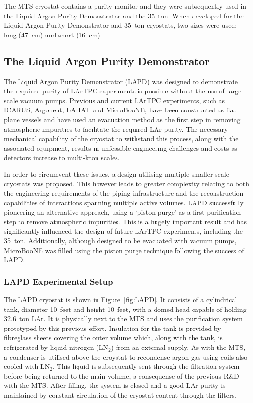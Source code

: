 The MTS cryostat contains a purity monitor and they were subsequently used in the Liquid Argon Purity Demonstrator and the 35~ton.  When developed for the Liquid Argon Purity Demonstrator and 35~ton cryostats, two sizes were used; long (47~cm) and short (16~cm).

\subsection{The Liquid Argon Purity Demonstrator}\label{sec:LAPD}

The Liquid Argon Purity Demonstrator (LAPD) \cite{MTS2011,LAPD2014,LAPDJINST2014} was designed to demonstrate the required purity of LArTPC experiments is possible without the use of large scale vacuum pumps.  Previous and current LArTPC experiments, such as ICARUS, Argoneut, LArIAT and MicroBooNE, have been constructed as flat plane vessels and have used an evacuation method as the first step in removing atmospheric impurities to facilitate the required LAr purity.  The necessary mechanical capability of the cryostat to withstand this process, along with the associated equipment, results in unfeasible engineering challenges and costs as detectors increase to multi-kton scales.

In order to circumvent these issues, a design utilising multiple smaller-scale cryostats was proposed.  This however leads to greater complexity relating to both the engineering requirements of the piping infrastructure and the reconstruction capabilities of interactions spanning multiple active volumes.  LAPD successfully pioneering an alternative approach, using a `piston purge' as a first purification step to remove atmospheric impurities.  This is a hugely important result and has significantly influenced the design of future LArTPC experiments, including the 35~ton.  Additionally, although designed to be evacuated with vacuum pumps, MicroBooNE was filled using the piston purge technique following the success of LAPD.

\subsubsection{LAPD Experimental Setup}\label{sec:LAPDExperimentalSetup}

The LAPD cryostat is shown in Figure~\ref{fig:LAPD}.  It consists of a cylindrical tank, diameter 10~feet and height 10~feet, with a domed head capable of holding 32.6~ton LAr.  It is physically next to the MTS and uses the purification system prototyped by this previous effort.  Insulation for the tank is provided by fibreglass sheets covering the outer volume which, along with the tank, is refrigerated by liquid nitrogen (LN$_2$) from an external supply.  As with the MTS, a condenser is utilised above the croystat to recondense argon gas using coils also cooled with LN$_2$.  This liquid is subsequently sent through the filtration system before being returned to the main volume, a consequense of the previous R\&D with the MTS.  After filling, the system is closed and a good LAr purity is maintained by constant circulation of the cryostat content through the filters.

